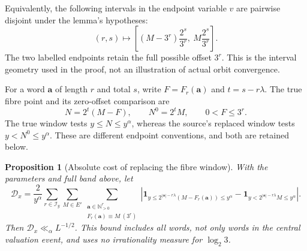 \documentclass[11pt]{article}
\newtheorem{proposition}{Proposition}
\theoremstyle{remark}\newtheorem{remark}[proposition]{Remark}
\newcommand{\NN}{\mathbb N}
\newcommand{\one}{\mathbf 1}
\begin{document}
Equivalently, the following intervals in the endpoint variable $v$ are
pairwise disjoint under the lemma's hypotheses:
\[
 \boxed{\quad
 (r,s)\longmapsto
 \left[(M-3^r)\frac{2^s}{3^r},\ M\frac{2^s}{3^r}\right].
 \quad}
\]
The two labelled endpoints retain the full possible offset $3^r$.
This is the interval geometry used in the proof, not an illustration of
actual orbit convergence.

For a word $\mathbf a$ of length $r$ and total $s$, write
$F=F_r(\mathbf a)$ and $t=s-r\lambda$. The true fibre point and its
zero-offset comparison are
\[
 N=2^t(M-F),\qquad N^0=2^tM,\qquad 0<F\le3^r.
\]
The true window tests $y\le N\le y^\alpha$, whereas the source's
replaced window tests $y<N^0\le y^\alpha$. These are different endpoint
conventions, and both are retained below.

\begin{proposition}[Absolute cost of replacing the fibre window]
\label{prop:window-cost}
With the parameters and full band above, let
\[
 \mathcal D_x=\frac{2}{y^\alpha}
 \sum_{r\in\mathcal I_y}\sum_{M\in E'}
 \sum_{\substack{\mathbf a\in\NN_{>0}^r\\F_r(\mathbf a)\equiv M\ (3^r)}}
 \left|\one_{y\le2^{|\mathbf a|-r\lambda}(M-F_r(\mathbf a))\le y^\alpha}
       -\one_{y<2^{|\mathbf a|-r\lambda}M\le y^\alpha}\right|.
\]
Then $\mathcal D_x\ll_\alpha L^{-1/2}$. This bound includes all words,
not only words in the central valuation event, and uses no irrationality
measure for $\log_2 3$.
\end{proposition}
\end{document}
